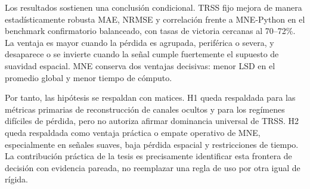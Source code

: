 Los resultados sostienen una conclusión condicional. TRSS fijo mejora de manera estadísticamente robusta MAE, NRMSE y correlación frente a MNE-Python en el benchmark confirmatorio balanceado, con tasas de victoria cercanas al 70--72\%. La ventaja es mayor cuando la pérdida es agrupada, periférica o severa, y desaparece o se invierte cuando la señal cumple fuertemente el supuesto de suavidad espacial. MNE conserva dos ventajas decisivas: menor LSD en el promedio global y menor tiempo de cómputo.

Por tanto, las hipótesis se respaldan con matices. H1 queda respaldada para las métricas primarias de reconstrucción de canales ocultos y para los regímenes difíciles de pérdida, pero no autoriza afirmar dominancia universal de TRSS. H2 queda respaldada como ventaja práctica o empate operativo de MNE, especialmente en señales suaves, baja pérdida espacial y restricciones de tiempo. La contribución práctica de la tesis es precisamente identificar esta frontera de decisión con evidencia pareada, no reemplazar una regla de uso por otra igual de rígida.

